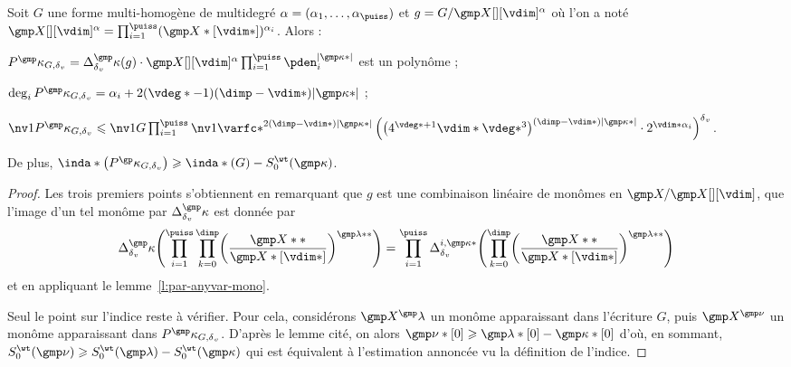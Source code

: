\begin{lem} \label{l:par-var}
  Soit \( G \) une forme multi-homogène de multidegré \( \alpha = (\alpha_1,
    \dots, \alpha_\puiss ) \) et \( g = G / \vmp[][\vdim]^{\alpha} \) où
  l'on a noté \( \vmp[][\vdim]^{\alpha} = \prod\fctrange
    (\vmp*[\vdim*])^{\alpha_\fct} \). Alors :
  \begin{enumthm}
    \item \( P^\dermp_{G, \dv}
        = \pdiff^\dermp(g)
        \cdot \vmp[][\vdim]^{\alpha}
        \prod\fctrange \pden_\fct^{\lgr{\dermp*}}
      \) est un polynôme ;
    \item \( \deg_\fct P^\dermp_{G, \dv}
        = \alpha_\fct + 2 (\vdeg* - 1) (\dimp - \vdim*) \lgr{\dermp*} \) ;
    \item \( \nv1{ P^\dermp_{G, \dv} }
        \le
        \nv1{ G }
        \prod\fctrange
        \nv1{ \varfc* }^{2 (\dimp - \vdim*) \lgr{\dermp*}}
        \left(
          \bigl( 4^{\vdeg*+1} \vdim* \vdeg*^{3} \bigr) ^{
            (\dimp - \vdim*) \lgr{\dermp*} }
          \cdot 2^{ \vdim* \alpha_\fct }
        \right)^\dv
      \).
  \end{enumthm}
  De plus, \( \inda* \bigl( P^\derp_{G, \dv} \bigr) \ge \inda*(G) -
    \wtsum*(\dermp) \).
\end{lem}

\begin{proof}
  Les trois premiers points s'obtiennent en remarquant que \( g \) est une
  combinaison linéaire de monômes en \( \vmp / \vmp[][\vdim] \), que l'image
  d'un tel monôme par \( \pdiff^\dermp \) est donnée par
  \begin{equation}
    \pdiff^\dermp \Biggl(
      \prod\fctrange \prod\indrange
      \biggl( \frac{ \vmp** }{ \vmp*[\vdim*] } \biggr)^{\imp**}
    \Biggr)
    =
    \prod\fctrange
    \pdiff^{\fct, \dermp*} \Biggl(
      \prod\indrange
      \biggl( \frac{ \vmp** }{ \vmp*[\vdim*] } \biggr)^{\imp**}
    \Biggr)
  \end{equation}
  et en appliquant le lemme~\ref{l:par-anyvar-mono}.

  Seul le point sur l'indice reste à vérifier. Pour cela, considérons \(
    \vmp^\imp \) un monôme apparaissant dans l'écriture \( G \), puis \(
    \vmp^{\gmp\nu} \) un monôme apparaissant dans \( P^\dermp_{G, \dv} \).
  D'après le lemme cité, on alors \( \gmp\nu*[0] \ge \imp*[0] - \dermp*[0] \)
  d'où, en sommant, \( \wtsum*(\gmp\nu) \ge \wtsum*(\imp) - \wtsum*(\dermp) \)
  qui est équivalent à l'estimation annoncée vu la définition de l'indice.
\end{proof}

